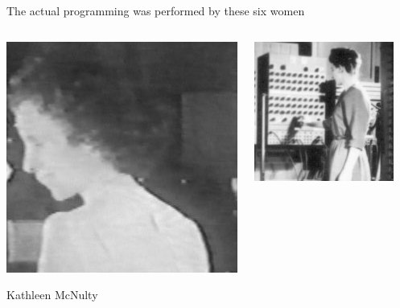 \documentclass[aspectratio=169]{beamer}
\begin{document}
\begin{frame}{The actual programming was performed by these six women}
\begin{columns}[t]
\begin{center}
\includegraphics[width=\linewidth]{Kay-McNulty.jpg}

Kathleen McNulty
\end{center}

\begin{center}
\includegraphics[width=\linewidth]{Fran-Bilas.jpg}


\end{center}
\end{columns}
\end{frame}
\end{document}
